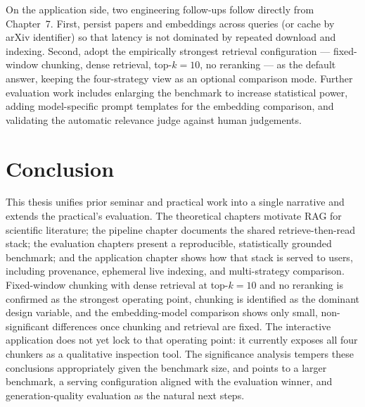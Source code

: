 \documentclass[12pt,a4paper,titlepage,oneside]{book}
\begin{document}
On the application side, two engineering follow-ups follow directly from Chapter~7. First, persist papers and embeddings across queries (or cache by arXiv identifier) so that latency is not dominated by repeated download and indexing. Second, adopt the empirically strongest retrieval configuration --- fixed-window chunking, dense retrieval, top-$k=10$, no reranking --- as the default answer, keeping the four-strategy view as an optional comparison mode. Further evaluation work includes enlarging the benchmark to increase statistical power, adding model-specific prompt templates for the embedding comparison, and validating the automatic relevance judge against human judgements.

\chapter{Conclusion}

This thesis unifies prior seminar and practical work into a single narrative and extends the practical's evaluation. The theoretical chapters motivate RAG for scientific literature; the pipeline chapter documents the shared retrieve-then-read stack; the evaluation chapters present a reproducible, statistically grounded benchmark; and the application chapter shows how that stack is served to users, including provenance, ephemeral live indexing, and multi-strategy comparison. Fixed-window chunking with dense retrieval at top-$k=10$ and no reranking is confirmed as the strongest operating point, chunking is identified as the dominant design variable, and the embedding-model comparison shows only small, non-significant differences once chunking and retrieval are fixed. The interactive application does not yet lock to that operating point: it currently exposes all four chunkers as a qualitative inspection tool. The significance analysis tempers these conclusions appropriately given the benchmark size, and points to a larger benchmark, a serving configuration aligned with the evaluation winner, and generation-quality evaluation as the natural next steps.


\end{document}
